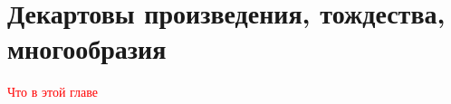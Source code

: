 \documentclass[../main/document.tex]{subfiles}
\begin{document}
\section{Декартовы произведения, тождества, многообразия}
\textcolor{red}{Что в этой главе}
\end{document}

